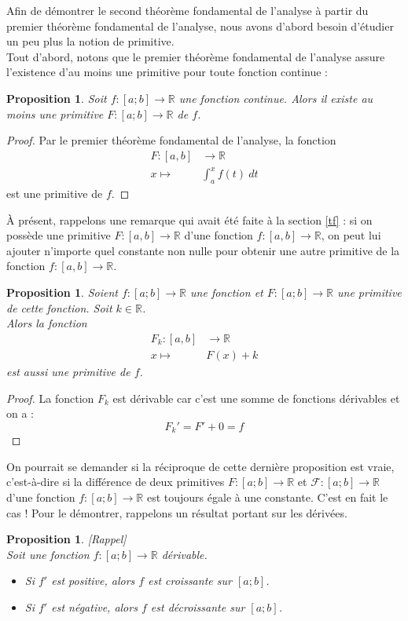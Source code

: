 \documentclass[a4paper,fontsize=13pt]{scrreprt}
\theoremstyle{plain}
\newtheorem{pro}[subsection]{Proposition}
\theoremstyle{definition}
\newcommand{\rr}{\mathbb{R}}
\begin{document}
Afin de démontrer le second théorème fondamental de l'analyse à partir du premier théorème fondamental de l'analyse, nous avons d'abord besoin d'étudier un peu plus la notion de primitive. \\
Tout d'abord, notons que le premier théorème fondamental de l'analyse assure l'existence d'au moins une primitive pour toute fonction continue :
\begin{pro}
Soit $f : [a;b] \to \rr$ une fonction continue. Alors il existe au moins une primitive $F : [a;b] \to \rr$ de $f$.
\end{pro}
\begin{proof}
Par le premier théorème fondamental de l'analyse, la fonction
\begin{align*}
F : [a,b] &\to \rr \\
x \mapsto& \int_{a}^{x} f(t)~dt
\end{align*}
est une primitive de $f$.
\end{proof}
À présent, rappelons une remarque qui avait été faite à la section \ref{tf} : si on possède une primitive $F : [a,b] \to \rr $ d'une fonction $f : [a,b] \to \rr $, on peut lui ajouter n'importe quel constante non nulle pour obtenir une autre primitive de la fonction $f : [a,b] \to \rr$.
\begin{pro}
Soient $f : [a;b] \to \rr$ une fonction et $F : [a;b] \to \rr$ une primitive de cette fonction. Soit $k \in \rr$. \\
Alors la fonction
\begin{align*}
F_k : [a,b] &\to \rr \\
x \mapsto& F(x)+k
\end{align*}
est aussi une primitive de $f$.
\end{pro}
\begin{proof}
La fonction $F_k$ est dérivable car c'est une somme de fonctions dérivables et on a :
$$F_k ' = F' +0 = f$$
\end{proof}
On pourrait se demander si la réciproque de cette dernière proposition est vraie, c'est-à-dire si la différence de deux primitives $F : [a;b] \to \rr$ et $\mathcal{F} : [a;b] \to \rr$ d'une fonction $f : [a;b] \to \rr$ est toujours égale à une constante. C'est en fait le cas ! Pour le démontrer, rappelons un résultat portant sur les dérivées.
\begin{pro} \label{rappel} [Rappel] \\
Soit une fonction $f : [a;b] \to \rr$ dérivable.
\begin{itemize}
\item [$\bullet$] Si $f'$ est positive, alors $f$ est croissante sur $[a;b]$.
\item [$\bullet$] Si $f'$ est négative, alors $f$ est décroissante sur $[a;b]$.
\end{itemize}
\end{pro}
\end{document}
